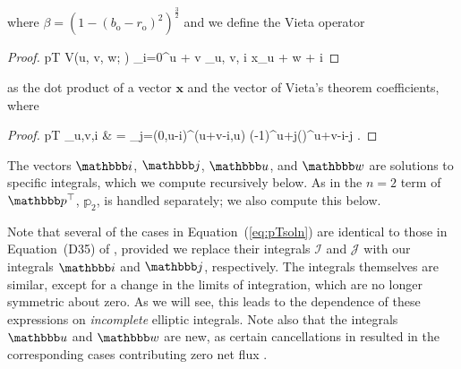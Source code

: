 \documentclass[modern]{aastex62}
\begin{document}
%
where $\beta = \left(1 - (b_\mathrm{o} - r_\mathrm{o})^2\right)^\frac{3}{2}$
and we define the Vieta operator
%
\begin{proof}{pT}
    \label{eq:V}
    V\left(u, v, w; \right) \equiv
    \sum_{i=0}^{u + v}
    _{u, v, i}
    x_{u + w + i}
\end{proof}
%
as the dot product of a vector $\mathbf{x}$ and
the vector of Vieta's theorem coefficients, where
\citep[c.f. Equation~D34 in][]{Luger2019}
%
\begin{proof}{pT}
    \label{eq:vieta}
    _{u,v,i} & =
    \sum_{j=(0,u-i)}^{(u+v-i,u)}
    (-1)^{u+j}\left(\right)^{u+v-i-j}
    \quad.
\end{proof}
%
The vectors $\viI$, $\viJ$,
$\viU$, and $\viW$ are solutions
to specific integrals, which we compute recursively below. As in
\citet{Luger2019} the $n = 2$ term of $\pT$, $\mathbb{p}_2$,
is handled separately; we also compute this below.

Note that several of the cases in Equation~(\ref{eq:pTsoln}) are
identical to those in Equation~(D35) of \citet{Luger2019}, provided
we replace their integrals $\mathcal{I}$ and $\mathcal{J}$ with our
integrals $\viI$ and $\viJ$, respectively. The integrals themselves
are similar, except for a change in the limits of integration, which
are no longer symmetric about zero. As we will see, this leads to the
dependence of these expressions on \emph{incomplete} elliptic integrals.
Note also that the integrals $\viU$ and $\viW$ are new, as certain
cancellations in \citet{Luger2019} resulted in the corresponding cases
contributing zero net flux \citep[last case in Equation~D35 of][]{Luger2019}.

%
\end{document}
